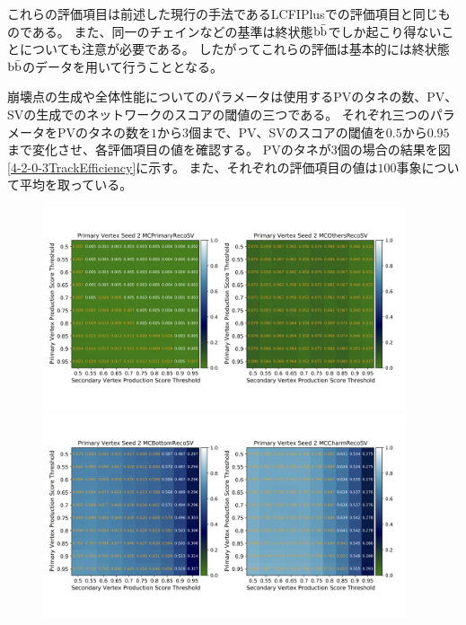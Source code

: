 これらの評価項目は前述した現行の手法であるLCFIPlusでの評価項目と同じものである。
また、同一のチェインなどの基準は終状態$\rm b\bar{b}$でしか起こり得ないことについても注意が必要である。
したがってこれらの評価は基本的には終状態$\rm b\bar{b}$のデータを用いて行うこととなる。

崩壊点の生成や全体性能についてのパラメータは使用するPVのタネの数、PV、SVの生成でのネットワークのスコアの閾値の三つである。
それぞれ三つのパラメータをPVのタネの数を$1$から$3$個まで、PV、SVのスコアの閾値を$0.5$から$0.95$まで変化させ、各評価項目の値を確認する。
PVのタネが$3$個の場合の結果を図\ref{4-2-0-3TrackEfficiency}に示す。
また、それぞれの評価項目の値は$100$事象について平均を取っている。

\begin{figure}[htbp]
 \centering
  \begin{minipage}{1.0\textwidth}
   \centering
    \includegraphics[trim = 0 140 0 140, width=0.95\textwidth, clip]{Figure/4VertexFinderwithDL/4-2-0-3TrackEfficiencyPVOthers.png}
   \end{minipage}
   
   \begin{minipage}{1.0\textwidth}
   \centering
    \includegraphics[trim = 0 140 0 140, width=0.95\textwidth, clip]{Figure/4VertexFinderwithDL/4-2-0-3TrackEfficiencyBottomCharm.png}
   \end{minipage}
   

\end{figure}
